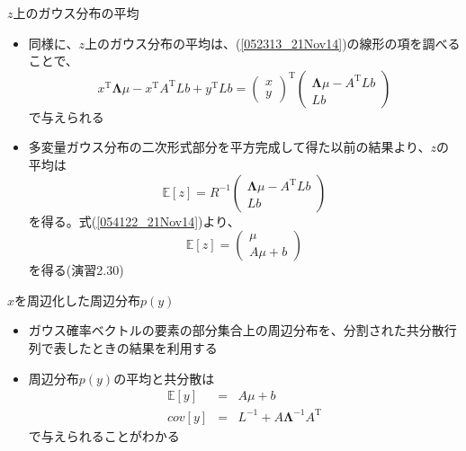 \begin{frame}{$z$上のガウス分布の平均}
 \begin{itemize}
  \item 同様に、$z$上のガウス分布の平均は、(\ref{052313_21Nov14})の線形の項を調べることで、
        \begin{equation}
         x^{\mathrm{T}}\bm{\Lambda}\mu-x^{\mathrm{T}}A^{\mathrm{T}}Lb+y^{\mathrm{T}}Lb =
          \begin{pmatrix}
           x \\
           y
          \end{pmatrix}^{\mathrm{T}}
          \begin{pmatrix}
           \bm{\Lambda}\mu-A^{\mathrm{T}}Lb \\
           Lb
          \end{pmatrix}
        \end{equation}
        で与えられる
  \item 多変量ガウス分布の二次形式部分を平方完成して得た以前の結果より、$z$の平均は
        \begin{equation}
         \mathbb{E}[z]=R^{-1}
          \begin{pmatrix}
           \bm{\Lambda}\mu-A^{\mathrm{T}}Lb \\
           Lb
          \end{pmatrix}
        \end{equation}
        を得る。式(\ref{054122_21Nov14})より、
        \begin{equation}
         \mathbb{E}[z]=
          \begin{pmatrix}
           \mu \\
           A\mu + b
          \end{pmatrix}
        \end{equation}
        を得る(演習2.30)
 \end{itemize}
\end{frame}

\begin{frame}{$x$を周辺化した周辺分布$p(y)$}
 \begin{itemize}
  \item ガウス確率ベクトルの要素の部分集合上の周辺分布を、分割された共分散行列で表したときの結果を利用する
  \item 周辺分布$p(y)$の平均と共分散は
        \begin{eqnarray}
         \mathbb{E}[y] &= &A\mu +b\\
         cov[y] &=& L^{-1} + A\bm{\Lambda}^{-1}A^{\mathrm{T}}
        \end{eqnarray}
        で与えられることがわかる
 \end{itemize}
\end{frame}


